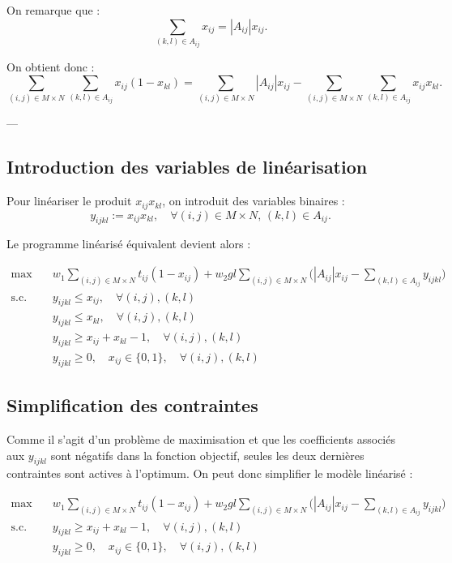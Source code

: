 \documentclass[a4paper,11pt]{article}
\begin{document}
On remarque que :
\[
\sum_{(k,l)\in A_{ij}} x_{ij} = |A_{ij}| x_{ij}.
\]

On obtient donc :
\[
\sum_{(i,j)\in M\times N} \sum_{(k,l)\in A_{ij}} x_{ij} (1 - x_{kl}) 
= \sum_{(i,j)\in M\times N} |A_{ij}| x_{ij} - \sum_{(i,j)\in M\times N} \sum_{(k,l)\in A_{ij}} x_{ij} x_{kl}.
\]

---

\subsection{Introduction des variables de linéarisation}

Pour linéariser le produit $x_{ij} x_{kl}$, on introduit des variables binaires :
\[
y_{ijkl} := x_{ij} x_{kl}, \quad \forall (i,j)\in M\times N, \, (k,l)\in A_{ij}.
\]

Le programme linéarisé équivalent devient alors :

\begin{align*}
\max \quad & w_1 \sum_{(i,j)\in M\times N} t_{ij} (1 - x_{ij}) 
+ w_2 g l \sum_{(i,j)\in M\times N} \Big( |A_{ij}| x_{ij} - \sum_{(k,l)\in A_{ij}} y_{ijkl} \Big) \\
\text{s.c.} \quad 
& y_{ijkl} \le x_{ij}, \quad \forall (i,j),(k,l) \\
& y_{ijkl} \le x_{kl}, \quad \forall (i,j),(k,l) \\
& y_{ijkl} \ge x_{ij} + x_{kl} - 1, \quad \forall (i,j),(k,l) \\
& y_{ijkl} \ge 0, \quad x_{ij} \in \{0,1\}, \quad \forall (i,j),(k,l)
\end{align*}

\subsection{Simplification des contraintes}

Comme il s'agit d'un problème de maximisation et que les coefficients associés aux $y_{ijkl}$ sont négatifs dans la fonction objectif, seules les deux dernières contraintes sont actives à l'optimum. On peut donc simplifier le modèle linéarisé :

\begin{align*}
\max \quad & w_1 \sum_{(i,j)\in M\times N} t_{ij} (1 - x_{ij}) 
+ w_2 g l \sum_{(i,j)\in M\times N} \Big( |A_{ij}| x_{ij} - \sum_{(k,l)\in A_{ij}} y_{ijkl} \Big) \\
\text{s.c.} \quad 
& y_{ijkl} \ge x_{ij} + x_{kl} - 1, \quad \forall (i,j),(k,l) \\
& y_{ijkl} \ge 0, \quad x_{ij} \in \{0,1\}, \quad \forall (i,j),(k,l)
\end{align*}
\end{document}
